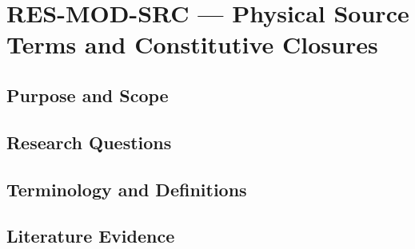 
\section{RES-MOD-SRC --- Physical Source Terms and Constitutive Closures}
\label{sec:res-mod-src}

\subsection{Purpose and Scope}
\label{sec:res-mod-src-purpose}


\subsection{Research Questions}
\label{sec:res-mod-src-research-questions}


\subsection{Terminology and Definitions}
\label{sec:res-mod-src-definitions}


\subsection{Literature Evidence}
\label{sec:res-mod-src-literature-evidence}

%

